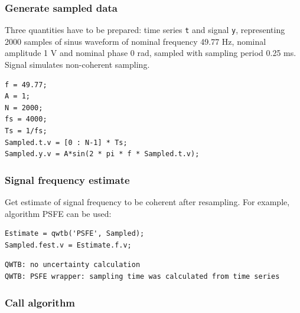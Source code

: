 \startcontents[localtoc]



{}
\subsubsection*{Generate sampled data}



Three quantities have to be prepared: time series \texttt{t} and signal \texttt{y},
representing 2000 samples of sinus waveform of nominal frequency 49.77 Hz, nominal
amplitude 1 V and nominal phase 0 rad, sampled with sampling period 0.25 ms.
Signal simulates non-coherent sampling.

\begin{lstlisting}
f = 49.77;
A = 1;
N = 2000;
fs = 4000;
Ts = 1/fs;
Sampled.t.v = [0 : N-1] * Ts;
Sampled.y.v = A*sin(2 * pi * f * Sampled.t.v);
\end{lstlisting}


{}
\subsubsection*{Signal frequency estimate}



Get estimate of signal frequency to be coherent after resampling. For
example, algorithm PSFE can be used:

\begin{lstlisting}
Estimate = qwtb('PSFE', Sampled);
Sampled.fest.v = Estimate.f.v;
\end{lstlisting}
\begin{lstlisting}[language={},xleftmargin=5pt,frame=none]
QWTB: no uncertainty calculation
QWTB: PSFE wrapper: sampling time was calculated from time series

\end{lstlisting}


{}
\subsubsection*{Call algorithm}

